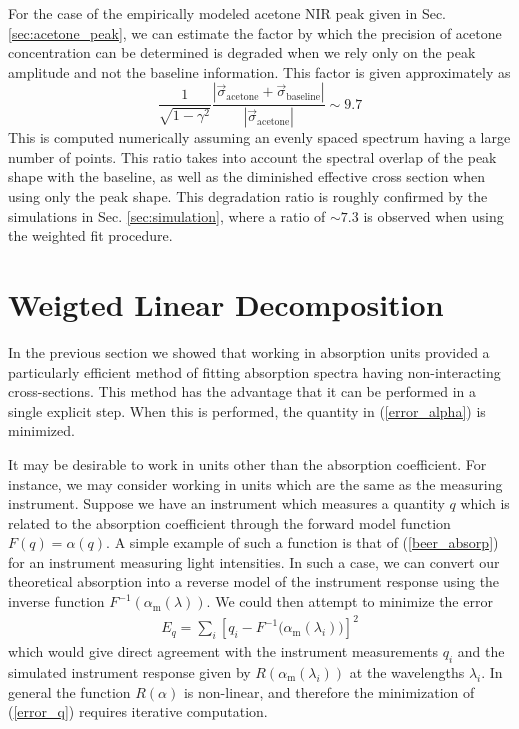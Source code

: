 \documentclass[8pt,a4paper]{report}
\begin{document}
	For the case of the empirically modeled acetone NIR peak given in Sec. \ref{sec:acetone_peak}, we can estimate the factor by which the precision of acetone concentration can be determined is degraded when we rely only on the peak amplitude and not the baseline information. This factor is given approximately as
	\begin{equation}
		\frac{1}{\sqrt{1-\gamma^2}} \frac{\left|\vec{\sigma}_\mathrm{acetone} + \vec{\sigma}_\mathrm{baseline}\right|}{\left|\vec{\sigma}_\mathrm{acetone}\right|} \sim 9.7
	\end{equation}
	This is computed numerically assuming an evenly spaced spectrum having a large number of points. This ratio takes into account the spectral overlap of the peak shape with the baseline, as well as the diminished effective cross section when using only the peak shape. This degradation ratio is roughly confirmed by the simulations in Sec. \ref{sec:simulation}, where a ratio of $\sim7.3$ is observed when using the weighted fit procedure.
	
	\section{Weigted Linear Decomposition} \label{sec:weighted_fit}
	
	In the previous section we showed that working in absorption units provided a particularly efficient method of fitting absorption spectra having non-interacting cross-sections. This method has the advantage that it can be performed in a single explicit step. When this is performed, the quantity in (\ref{error_alpha}) is minimized.
	
	It may be desirable to work in units other than the absorption coefficient. For instance, we may consider working in units which are the same as the measuring instrument. Suppose we have an instrument which measures a quantity $q$ which is related to the absorption coefficient through the forward model function $F(q) = \alpha(q)$. A simple example of such a function is that of (\ref{beer_absorp}) for an instrument measuring light intensities. In such a case, we can convert our theoretical absorption into a reverse model of the instrument response using the inverse function $F^{-1}(\alpha_\mathrm{m}(\lambda))$. We could then attempt to minimize the error
	\begin{align}\label{error_q}
		E_q = \sum_i \left[ q_i - F^{-1}\big(\alpha_\mathrm{m}(\lambda_i)\big) \right]^2
	\end{align}
	which would give direct agreement with the instrument measurements $q_i$ and the simulated instrument response given by $R(\alpha_\mathrm{m}\left(\lambda_i\right))$ at the wavelengths $\lambda_i$. In general the function $R(\alpha)$ is non-linear, and therefore the minimization of (\ref{error_q}) requires iterative computation.
	
\end{document}
